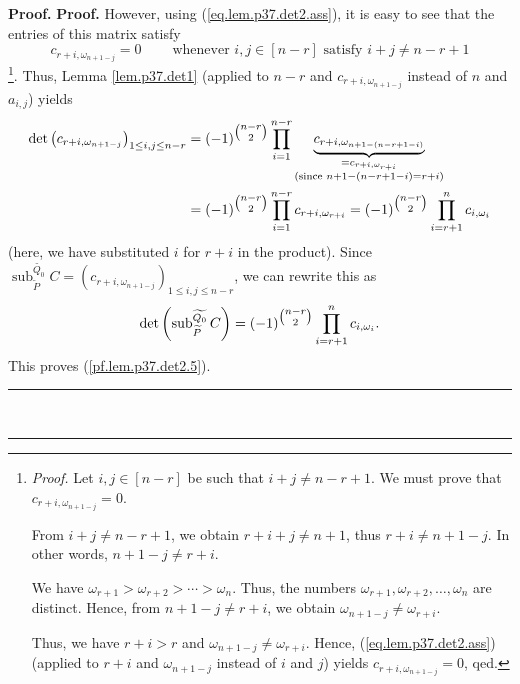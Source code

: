 \documentclass[numbers=enddot,12pt,final,onecolumn,notitlepage]{scrartcl}%
\theoremstyle{definition}
\newenvironment{proof}[1][Proof]{\noindent\textbf{#1.} }{\ \rule{0.5em}{0.5em}}
\let\prodnonlimits\prod
\renewcommand{\prod}{\prodnonlimits\limits}
\begin{document}
\begin{enumerate}
\begin{proof}
\begin{proof}
However, using (\ref{eq.lem.p37.det2.ass}), it is easy to see that the entries
of this matrix satisfy%
\[
c_{r+i,\omega_{n+1-j}}=0\ \ \ \ \ \ \ \ \ \ \text{whenever }i,j\in\left[
n-r\right]  \text{ satisfy }i+j\neq n-r+1
\]
\footnote{\textit{Proof.} Let $i,j\in\left[  n-r\right]  $ be such that
$i+j\neq n-r+1$. We must prove that $c_{r+i,\omega_{n+1-j}}=0$.
\par
From $i+j\neq n-r+1$, we obtain $r+i+j\neq n+1$, thus $r+i\neq n+1-j$. In
other words, $n+1-j\neq r+i$.
\par
We have $\omega_{r+1}>\omega_{r+2}>\cdots>\omega_{n}$. Thus, the numbers
$\omega_{r+1},\omega_{r+2},\ldots,\omega_{n}$ are distinct. Hence, from
$n+1-j\neq r+i$, we obtain $\omega_{n+1-j}\neq\omega_{r+i}$.
\par
Thus, we have $r+i>r$ and $\omega_{n+1-j}\neq\omega_{r+i}$. Hence,
(\ref{eq.lem.p37.det2.ass}) (applied to $r+i$ and $\omega_{n+1-j}$ instead of
$i$ and $j$) yields $c_{r+i,\omega_{n+1-j}}=0$, qed.}. Thus, Lemma
\ref{lem.p37.det1} (applied to $n-r$ and $c_{r+i,\omega_{n+1-j}}$ instead of
$n$ and $a_{i,j}$) yields
\begin{align*}
\det\left(  c_{r+i,\omega_{n+1-j}}\right)  _{1\leq i,j\leq n-r}  &  =\left(
-1\right)  ^{\tbinom{n-r}{2}}\prod_{i=1}^{n-r}\underbrace{c_{r+i,\omega
_{n+1-\left(  n-r+1-i\right)  }}}_{\substack{=c_{r+i,\omega_{r+i}%
}\\\text{(since }n+1-\left(  n-r+1-i\right)  =r+i\text{)}}}\\
&  =\left(  -1\right)  ^{\tbinom{n-r}{2}}\prod_{i=1}^{n-r}c_{r+i,\omega_{r+i}%
}=\left(  -1\right)  ^{\tbinom{n-r}{2}}\prod_{i=r+1}^{n}c_{i,\omega_{i}}%
\end{align*}
(here, we have substituted $i$ for $r+i$ in the product). Since
$\operatorname*{sub}\nolimits_{\widetilde{P}}^{\widetilde{Q_{0}}}C=\left(
c_{r+i,\omega_{n+1-j}}\right)  _{1\leq i,j\leq n-r}$, we can rewrite this as%
\[
\det\left(  \operatorname*{sub}\nolimits_{\widetilde{P}}^{\widetilde{Q_{0}}%
}C\right)  =\left(  -1\right)  ^{\tbinom{n-r}{2}}\prod_{i=r+1}^{n}%
c_{i,\omega_{i}}.
\]
This proves (\ref{pf.lem.p37.det2.5}).
\end{proof}


\end{proof}
\end{enumerate}
\end{document}
